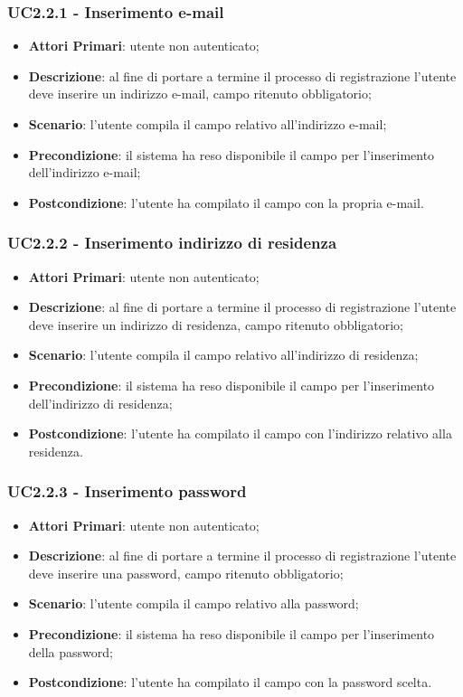 \subsubsection{UC2.2.1 - Inserimento e-mail}
\begin{itemize}
	\item \textbf{Attori Primari}: utente non autenticato;
	\item \textbf{Descrizione}: al fine di portare a termine il processo di registrazione l'utente deve inserire un indirizzo e-mail, campo ritenuto obbligatorio;
	\item \textbf{Scenario}: l'utente compila il campo relativo all'indirizzo e-mail;
	\item \textbf{Precondizione}: il sistema ha reso disponibile il campo per l'inserimento dell'indirizzo e-mail;
	\item \textbf{Postcondizione}: l'utente ha compilato il campo con la propria e-mail.

\end{itemize}
\subsubsection{UC2.2.2 - Inserimento indirizzo di residenza}
\begin{itemize}
	\item \textbf{Attori Primari}: utente non autenticato;
	\item \textbf{Descrizione}: al fine di portare a termine il processo di registrazione l'utente deve inserire un indirizzo di residenza, campo ritenuto obbligatorio;
	\item \textbf{Scenario}: l'utente compila il campo relativo all'indirizzo di residenza;
	\item \textbf{Precondizione}: il sistema ha reso disponibile il campo per l'inserimento dell'indirizzo di residenza;
	\item \textbf{Postcondizione}: l'utente ha compilato il campo con l'indirizzo relativo alla residenza.
\end{itemize}
\subsubsection{UC2.2.3 - Inserimento password}
\begin{itemize}
	\item \textbf{Attori Primari}: utente non autenticato;
	\item \textbf{Descrizione}: al fine di portare a termine il processo di registrazione l'utente deve inserire una password, campo ritenuto obbligatorio;
	\item \textbf{Scenario}: l'utente compila il campo relativo alla password;
	\item \textbf{Precondizione}: il sistema ha reso disponibile il campo per l'inserimento della password;
	\item \textbf{Postcondizione}: l'utente ha compilato il campo con la password scelta.
\end{itemize}
